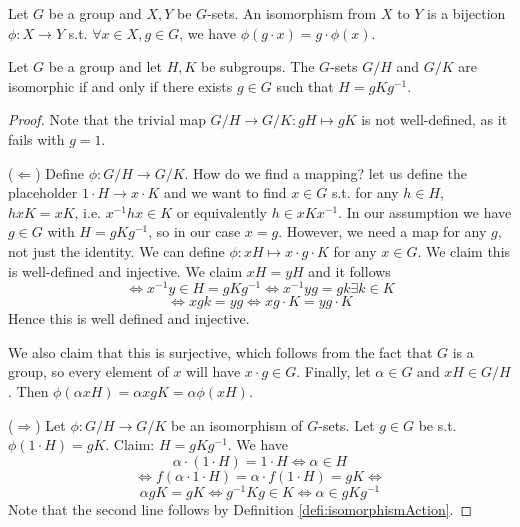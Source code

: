 \begin{definition} 
  Let $G$ be a group and $X,Y$ be $G$-sets. An isomorphism from $X$ to $Y$ is a bijection
  $\phi:X\to Y$ s.t. $\forall x\in X, g\in G$, we have $\phi(g\cdot x)=g\cdot \phi(x)$.
  \label{defi:isomorphismAction}
\end{definition}

\begin{theorem}
  Let $G$ be a group and let $H,K$ be subgroups. The $G$-sets $G/H$ and $G/K$ are
  isomorphic if and only if there exists $g\in G$ such that $H=gKg^{-1}$.
  \label{thm:cosetsIsomorphic}
\end{theorem}
\begin{proof}
  Note that the trivial map $G/H\to G/K:gH\mapsto gK$ is not well-defined, as it fails
  with $g=1$.

  ($\Leftarrow$) Define $\phi:G/H\to G/K$. How do we find a mapping? let us define the
  placeholder $1\cdot H\to x\cdot K$ and we want to find $x\in G$ s.t. for any $h\in H$,
  $hxK = xK$, i.e. $x^{-1}hx\in K$ or equivalently $h\in xKx^{-1}$. In our assumption we
  have $g\in G$ with $H=gKg^{-1}$, so in our case $x=g$. However, we need a map for any
  $g$, not just the identity. We can define $\phi:xH\mapsto x\cdot g \cdot K$ for any $x\in G$.
  We claim this is well-defined and injective. We claim $xH=yH$ and it follows
  \[\iff x^{-1}y\in H=gKg^{-1} \iff x^{-1}yg = gk \exists k\in K \]
  \[\iff xgk= yg \iff xg\cdot K = yg\cdot K\]
Hence this is well defined and injective.

  We also claim that this is surjective, which follows from the fact that $G$ is a group,
  so every element of $x$ will have $x\cdot g\in G$. Finally, let $\alpha\in G$ and $xH\in
  G/H$. Then $\phi(\alpha xH)=\alpha xgK = \alpha \phi(xH)$.

  ($\Rightarrow$) Let $\phi: G/H\to G/K$ be an isomorphism of $G$-sets. Let $g\in G$ be
  s.t. $\phi(1\cdot H)=gK$. Claim: $H=gKg^{-1}$. We have 
  \[\alpha\cdot (1\cdot H)=1\cdot H \iff \alpha\in H \]
  \[\iff f(\alpha\cdot 1\cdot H)=\alpha\cdot f(1\cdot H)=gK\iff \]
    \[\alpha g K = gK \iff g^{-1}Kg\in K \iff \alpha \in gKg^{-1}\]
    Note that the second line follows by Definition \ref{defi:isomorphismAction}.
\end{proof}
